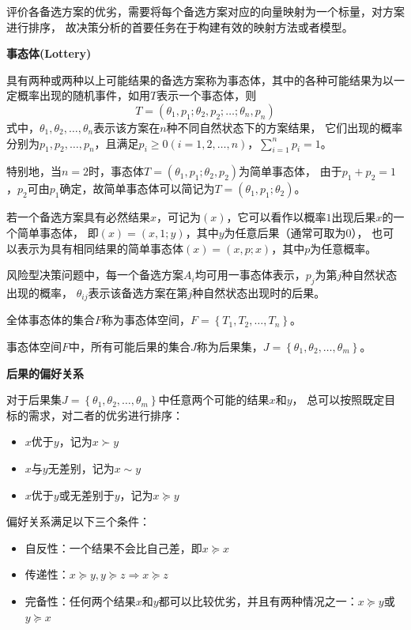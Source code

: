 \documentclass[a4paper,12pt]{article}
\begin{document}
评价各备选方案的优劣，需要将每个备选方案对应的向量映射为一个标量，对方案进行排序，
故决策分析的首要任务在于构建有效的映射方法或者模型。

\noindent
\textbf{事态体(Lottery)}

具有两种或两种以上可能结果的备选方案称为事态体，其中的各种可能结果为以一定概率出现的随机事件，如用$T$表示一个事态体，则
$$
T=\left(\theta_1,p_1;\theta_2,p_2;\dots;\theta_n,p_n\right)
$$
式中，$\theta_1,\theta_2,\dots,\theta_n$表示该方案在$n$种不同自然状态下的方案结果，
它们出现的概率分别为$p_1,p_2,\dots,p_n$，且满足$p_i\ge 0(i=1,2,\dots,n)$，$\sum_{i=1}^np_i=1$。

特别地，当$n=2$时，事态体$T=\left(\theta_1,p_1;\theta_2,p_2\right)$为简单事态体，
由于$p_1+p_2=1$，$p_2$可由$p_1$确定，故简单事态体可以简记为$T=\left(\theta_1,p_1;\theta_2\right)$。

若一个备选方案具有必然结果$x$，可记为$\left(x\right)$，它可以看作以概率$1$出现后果$x$的一个简单事态体，
即$\left(x\right)=\left(x,1;y\right)$，其中$y$为任意后果（通常可取为$0$），
也可以表示为具有相同结果的简单事态体$\left(x\right)=\left(x,p;x\right)$，其中$p$为任意概率。

风险型决策问题中，每一个备选方案$A_i$均可用一事态体表示，$p_j$为第$j$种自然状态出现的概率，
$\theta_{ij}$表示该备选方案在第$j$种自然状态出现时的后果。

全体事态体的集合$F$称为事态体空间，$F=\left\{T_1,T_2,\dots,T_n\right\}$。

事态体空间$F$中，所有可能后果的集合$J$称为后果集，$J=\left\{\theta_1,\theta_2,\dots,\theta_m\right\}$。

\noindent
\textbf{后果的偏好关系}

对于后果集$J=\left\{\theta_1,\theta_2,\dots,\theta_m\right\}$中任意两个可能的结果$x$和$y$，
总可以按照既定目标的需求，对二者的优劣进行排序：
\begin{itemize}[itemsep=0pt,parsep=0pt]
    \item $x$优于$y$，记为$x\succ y$
    \item $x$与$y$无差别，记为$x\sim y$
    \item $x$优于$y$或无差别于$y$，记为$x\succeq y$
\end{itemize}  

偏好关系满足以下三个条件：
\begin{itemize}[itemsep=0pt,parsep=0pt]
    \item 自反性：一个结果不会比自己差，即$x\succeq x$
    \item 传递性：$x\succeq y,y\succeq z \Rightarrow x\succeq z$
    \item 完备性：任何两个结果$x$和$y$都可以比较优劣，并且有两种情况之一：$x \succeq y$或$y\succeq x$
\end{itemize} 
\end{document}
